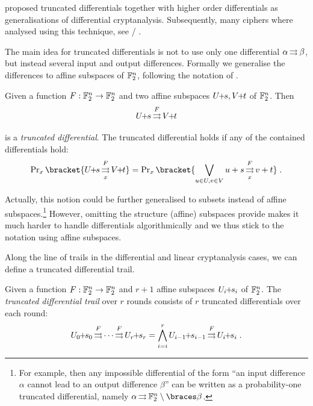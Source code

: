 \textcite{FSE:Knudsen94} proposed truncated differentials together with higher order differentials as generalisations of differential cryptanalysis.
Subsequently, many ciphers where analysed using this technique, see \eg/ .

The main idea for truncated differentials is not to use only one differential $\alpha \operatorname*{\rightrightarrows}^{}_{} \beta$, but instead several input and output differences.
Formally we generalise the differences to affine subspaces of $\mathbb{F}_2^n$, following the notation of \textcite{FSE:BloLeaNyb14}.
\begin{definition}
    Given a function $F : \mathbb{F}_2^n \to \mathbb{F}_2^n$ and two affine subspaces $\coset{U}{s}, \coset{V}{t}$ of $\mathbb{F}_2^n$.
    Then
    \begin{equation*}
        \propDiff{\coset{U}{s}}{F}{}{\coset{V}{t}}
    \end{equation*}
    is a \emph{truncated differential}.
    The truncated differential holds if any of the contained differentials hold:
    \begin{equation*}
        \Prob_x\bracket{\propDiff{\coset{U}{s}}{F}{x}{\coset{V}{t}}} = \Prob_x\bracket{\bigvee_{u \in U, v \in V} \propDiff{u+s}{F}{x}{v+t}}\;.
    \end{equation*}
\end{definition}

Actually, this notion could be further generalised to subsets instead of affine subspaces.\footnote{%
    For example, then any impossible differential of the form \enquote{an input difference $\alpha$ cannot lead to an output difference $\beta$} can be written as a probability-one truncated differential, namely $\propDiff{\alpha}{}{}{\F_2^n \setminus\set{\beta}}$.
}
However, omitting the structure (affine) subspaces provide makes it much harder to handle differentials algorithmically and we thus stick to the notation using affine subspaces.

Along the line of trails in the differential and linear cryptanalysis cases, we can define a truncated differential trail.
\begin{definition}
    Given a function $F : \mathbb{F}_2^n \to \mathbb{F}_2^n$ and $r+1$ affine subspaces $U_i \!\! + \!\! s_i$ of $\mathbb{F}_2^n$.
    The \emph{truncated differential trail} over $r$ rounds consists of $r$ truncated differentials over each round:
    \begin{equation*}
        \propDiff{\coset{U_0}{s_0}}{F}{}{\propDiff{\cdots}{F}{}{\coset{U_r}{s_r}}} = \bigwedge_{i=i}^{r} \propDiff{\coset{U_{i-1}}{s_{i-1}}}{F}{}{\coset{U_i}{s_i}}\;.
    \end{equation*}
\end{definition}

